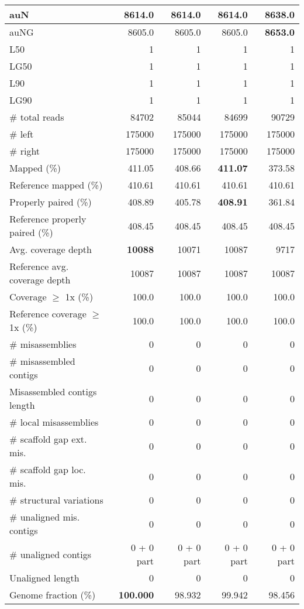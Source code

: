 \documentclass[12pt,a4paper]{article}
\begin{document}
\begin{table}[ht]
\begin{center}
\begin{tabular}{|l*{4}{|r}|}
auN & 8614.0 & 8614.0 & 8614.0 & {\bf 8638.0} \\ \hline
auNG & 8605.0 & 8605.0 & 8605.0 & {\bf 8653.0} \\ \hline
L50 & 1 & 1 & 1 & 1 \\ \hline
LG50 & 1 & 1 & 1 & 1 \\ \hline
L90 & 1 & 1 & 1 & 1 \\ \hline
LG90 & 1 & 1 & 1 & 1 \\ \hline
\# total reads & 84702 & 85044 & 84699 & 90729 \\ \hline
\# left & 175000 & 175000 & 175000 & 175000 \\ \hline
\# right & 175000 & 175000 & 175000 & 175000 \\ \hline
Mapped (\%) & 411.05 & 408.66 & {\bf 411.07} & 373.58 \\ \hline
Reference mapped (\%) & 410.61 & 410.61 & 410.61 & 410.61 \\ \hline
Properly paired (\%) & 408.89 & 405.78 & {\bf 408.91} & 361.84 \\ \hline
Reference properly paired (\%) & 408.45 & 408.45 & 408.45 & 408.45 \\ \hline
Avg. coverage depth & {\bf 10088} & 10071 & 10087 & 9717 \\ \hline
Reference avg. coverage depth & 10087 & 10087 & 10087 & 10087 \\ \hline
Coverage $\geq$ 1x (\%) & 100.0 & 100.0 & 100.0 & 100.0 \\ \hline
Reference coverage $\geq$ 1x (\%) & 100.0 & 100.0 & 100.0 & 100.0 \\ \hline
\# misassemblies & 0 & 0 & 0 & 0 \\ \hline
\# misassembled contigs & 0 & 0 & 0 & 0 \\ \hline
Misassembled contigs length & 0 & 0 & 0 & 0 \\ \hline
\# local misassemblies & 0 & 0 & 0 & 0 \\ \hline
\# scaffold gap ext. mis. & 0 & 0 & 0 & 0 \\ \hline
\# scaffold gap loc. mis. & 0 & 0 & 0 & 0 \\ \hline
\# structural variations & 0 & 0 & 0 & 0 \\ \hline
\# unaligned mis. contigs & 0 & 0 & 0 & 0 \\ \hline
\# unaligned contigs & 0 + 0 part & 0 + 0 part & 0 + 0 part & 0 + 0 part \\ \hline
Unaligned length & 0 & 0 & 0 & 0 \\ \hline
Genome fraction (\%) & {\bf 100.000} & 98.932 & 99.942 & 98.456 \\ \hline

\end{tabular}
\end{center}
\end{table}
\end{document}
